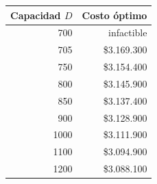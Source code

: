 \begin{tabular}{rr}
\toprule
Capacidad $D$ & Costo óptimo \\
\midrule
700 & infactible \\
705 & \$3.169.300 \\
750 & \$3.154.400 \\
800 & \$3.145.900 \\
850 & \$3.137.400 \\
900 & \$3.128.900 \\
1000 & \$3.111.900 \\
1100 & \$3.094.900 \\
1200 & \$3.088.100 \\
\bottomrule
\end{tabular}
